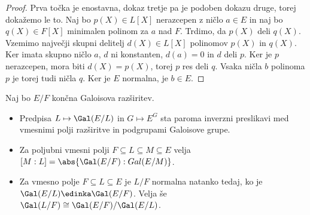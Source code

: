 \begin{proof}
  Prva točka je enostavna, dokaz tretje pa je podoben dokazu druge, torej
  dokažemo le to.
  Naj bo $p(X) \in L[X]$ nerazcepen z ničlo $a \in E$ in
  naj bo $q(X) \in F[X]$ minimalen polinom za $a$ nad $F$.
  Trdimo, da $p(X)$ deli $q(X)$.
  Vzemimo največji skupni delitelj $d(X) \in L[X]$ polinomov $p(X)$ in $q(X)$.
  Ker imata skupno ničlo $a$, $d$ ni konstanten, $d(a) = 0$ in $d$ deli $p$.
  Ker je $p$ nerazcepen, mora biti $d(X) = p(X)$, torej $p$ res deli $q$.
  Vsaka ničla $b$ polinoma $p$ je torej tudi ničla $q$.
  Ker je $E$ normalna, je $b \in E$.
\end{proof}

\begin{izrek}
  Naj bo $E/F$ končna Galoisova razširitev.
  \begin{itemize}
  \item Predpisa $L \mapsto \Gal(E/L)$ in $G \mapsto E^G$ sta paroma inverzni
	preslikavi med vmesnimi polji razširitve in podgrupami Galoisove grupe.
  \item Za poljubni vmesni polji $F \subseteq L \subseteq M \subseteq E$ velja
	$[M:L] = \abs{\Gal(E/F) : Gal(E/M)}$.
  \item Za vmesno polje $F \subseteq L \subseteq E$ je $L/F$ normalna natanko
	tedaj, ko je $\Gal(E/L) \edinka \Gal(E/F)$.
	Velja še $\Gal(L/F) \cong \Gal(E/F) / \Gal(E/L)$.
  \end{itemize}
\end{izrek}

